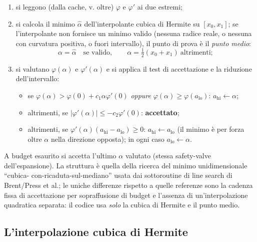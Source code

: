 \begin{enumerate}
\item si leggono (dalla cache, v. oltre) $\varphi$ e $\varphi'$ ai due
  estremi;
\item si calcola il minimo $\hat{\alpha}$ dell'interpolante cubica di
  Hermite su $[x_0, x_1]$; se l'interpolante non fornisce un minimo valido
  (nessuna radice reale, o nessuna con curvatura positiva, o fuori
  intervallo), il punto di prova è il \emph{punto medio}:
  \begin{equation}
  \label{eq:zoom-next}
  \alpha = \hat{\alpha}
  \quad\text{se valido},\qquad
  \alpha = \tfrac{1}{2}(x_0 + x_1)\ \text{altrimenti};
  \end{equation}
\item si valutano $\varphi(\alpha)$ e $\varphi'(\alpha)$ e si applica il
  test di accettazione e la riduzione dell'intervallo:
  \begin{itemize}
  \item se $\varphi(\alpha) > \varphi(0) + c_1\alpha\varphi'(0)$
    \emph{oppure} $\varphi(\alpha) \ge \varphi(a_{\mathrm{lo}})$:
    $a_{\mathrm{hi}} \leftarrow \alpha$;
  \item altrimenti, se $|\varphi'(\alpha)| \le -c_2\varphi'(0)$:
    \textbf{accettato};
  \item altrimenti, se $\varphi'(\alpha)(a_{\mathrm{hi}} - a_{\mathrm{lo}})
    \ge 0$: $a_{\mathrm{hi}} \leftarrow a_{\mathrm{lo}}$ (il minimo è
    per forza oltre $\alpha$ nella direzione opposta); in ogni caso
    $a_{\mathrm{lo}} \leftarrow \alpha$.
  \end{itemize}
\end{enumerate}

A budget esaurito si accetta l'ultimo $\alpha$ valutato (stessa
safety-valve dell'espansione). La struttura è quella della ricerca del
minimo unidimensionale ``cubica- con-ricaduta-sul-mediano'' usata dai
sottoroutine di line search di Brent/Press et al.; le uniche differenze
rispetto a quelle referenze sono la cadenza fissa di accettazione per
sopraffusione di budget e l'assenza di un'interpolazione quadratica
separata: il codice usa \emph{solo} la cubica di Hermite e il punto medio.

\subsection{L'interpolazione cubica di Hermite}
\label{sec:lbfgs-hermite}

